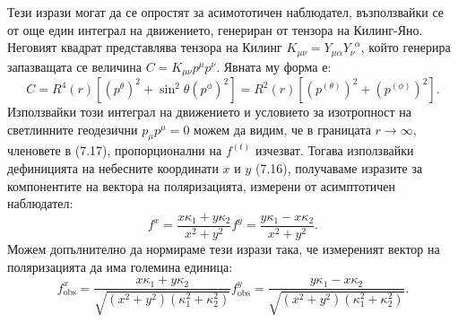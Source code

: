 Тези изрази могат да се опростят за асимототичен наблюдател, възползвайки се от още един интеграл на движението, генериран от тензора на Килинг-Яно. Неговият квадрат представлява тензора на Килинг $K_{\mu\nu} = Y_{\mu\alpha}Y_{\nu}^{\,\,\,\alpha}$, който генерира запазващата се величина $C = K_{\mu\nu}p^\mu p^\nu$. Явната му форма е:
\begin{equation}
	C =  R^4(r)\left[\left(p^{\theta}\right)^2 + \sin^2\theta \left(p^{\phi}\right)^2\right] = R^2(r)\left[\left(p^{(\theta)}\right)^2 + \left(p^{(\phi)}\right)^2\right].
\end{equation}
Използвайки този интеграл на движението и условието за изотропност на светлинните геодезични $p_\mu p^\mu = 0$ можем да видим, че в границата $r\rightarrow\infty$, членовете в (7.17), пропорционални на $f^{(t)}$ изчезват. Тогава използвайки дефиницията на небесните координати $x$ и $y$ (7.16), получаваме изразите за компонентите на вектора на поляризацията, измерени от асимптотичен наблюдател:
\begin{subequations}
	\begin{equation}
		f^x = \frac{x\kappa_1 + y\kappa_2}{x^2 + y^2}
	\end{equation}
	\begin{equation}
		f^y = \frac{y \kappa_1 - x\kappa_2}{x^2 + y^2}.
	\end{equation}
\end{subequations}
Можем допълнително да нормираме тези изрази така, че измереният вектор на поляризацията да има големина единица:
\begin{subequations}
	\begin{equation}
		f^x_\text{obs} = \frac{x\kappa_1 + y\kappa_2}{\sqrt{(x^2 + y^2)(\kappa_1^2 + \kappa_2^2)}}
	\end{equation}
	\begin{equation}
		f^y_\text{obs} = \frac{y \kappa_1 - x\kappa_2}{\sqrt{(x^2 + y^2)(\kappa_1^2 + \kappa_2^2)}}.
	\end{equation}
\end{subequations}

